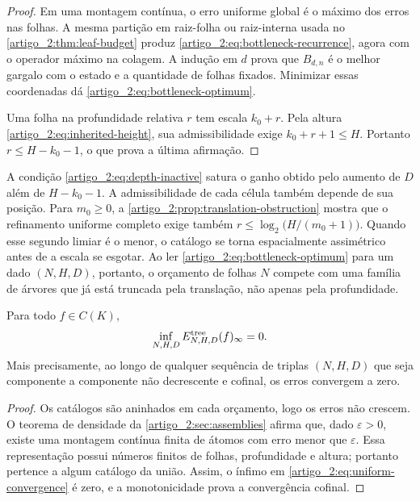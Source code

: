 \begin{proof}
Em uma montagem contínua, o erro uniforme global é o máximo dos erros nas
folhas. A mesma partição em raiz-folha ou raiz-interna usada no
\cref{artigo_2:thm:leaf-budget} produz
\eqref{artigo_2:eq:bottleneck-recurrence}, agora com o operador máximo na colagem.
A indução em $d$ prova que $B_{d,n}$ é o melhor gargalo com o estado e a
quantidade de folhas fixados. Minimizar essas coordenadas dá
\eqref{artigo_2:eq:bottleneck-optimum}.

Uma folha na profundidade relativa $r$ tem escala $k_0+r$. Pela altura
\eqref{artigo_2:eq:inherited-height}, sua admissibilidade exige
$k_0+r+1\le H$. Portanto $r\le H-k_0-1$, o que prova a última afirmação.
\end{proof}

\begin{remark}\label{map:artigo_2:8.3}
\label{artigo_2:rem:depth-vs-translation}
A condição \eqref{artigo_2:eq:depth-inactive} satura o ganho obtido pelo aumento de $D$
além de $H-k_0-1$. A admissibilidade de cada célula também depende de sua
posição.
Para $m_0\ge0$, a \cref{artigo_2:prop:translation-obstruction} mostra que o refinamento
uniforme completo exige também
$r\le\log_2\bigl(H/(m_0+1)\bigr)$. Quando esse segundo limiar é o menor, o
catálogo se torna espacialmente assimétrico antes de a escala se esgotar. Ao ler
\eqref{artigo_2:eq:bottleneck-optimum} para um dado $(N,H,D)$, portanto, o orçamento de
folhas $N$ compete com uma família de árvores que já está truncada pela
translação, não apenas pela profundidade.
\end{remark}

\begin{corollary}\label{map:artigo_2:8.4}
\label{artigo_2:cor:uniform-convergence}
Para todo $f\in C(K)$,
\begin{equation}
 \inf_{N,H,D}E_{N,H,D}^{\rm tree}(f)_\infty=0.
 \label{artigo_2:eq:uniform-convergence}
\end{equation}
Mais precisamente, ao longo de qualquer sequência de triplas $(N,H,D)$ que
seja componente a componente não decrescente e cofinal, os erros convergem a
zero.
\end{corollary}

\begin{proof}
Os catálogos são aninhados em cada orçamento, logo os erros não crescem. O
teorema de densidade da \cref{artigo_2:sec:assemblies} afirma que, dado $\varepsilon>0$,
existe uma montagem contínua finita de átomos com erro menor que
$\varepsilon$. Essa representação possui números finitos de folhas,
profundidade e altura; portanto pertence a algum catálogo da união. Assim, o
ínfimo em \eqref{artigo_2:eq:uniform-convergence} é zero, e a monotonicidade prova a
convergência cofinal.
\end{proof}

